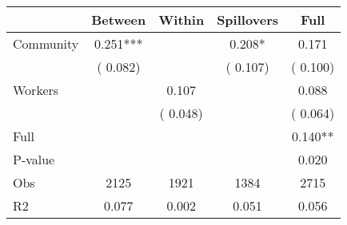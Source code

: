 
\begin{tabular}{l*{4}{c}}\hline&\multicolumn{1}{c}{Between}&\multicolumn{1}{c}{Within}&\multicolumn{1}{c}{Spillovers}&\multicolumn{1}{c}{Full}\\ \hline
 Community             &              0.251***      &                                               &        0.208* &         0.171                            \\ 
                               &        (       0.082)           &                                       &       (       0.107)     &      (       0.100)                                           \\ 
 Workers       &                                               &        0.107    &                                &             0.088                            \\ 
                               &                                               & (       0.048)                  &                                        &      (       0.064)                                           \\ 
\hline                                                                                                                                                                                                                                            
 Full                  &                                               &                                               &                                        &             0.140**                                     \\ 
 P-value               &                                               &                                               &                                        &             0.020                                           \\ 
 Obs                   &               2125               &       1921                       &       1384                &              2715                                               \\ 
 R2                    &                      0.077              &              0.002                      &              0.051               &                     0.056                                              \\ 
\hline \end{tabular}                                                                                                                                                                                                              